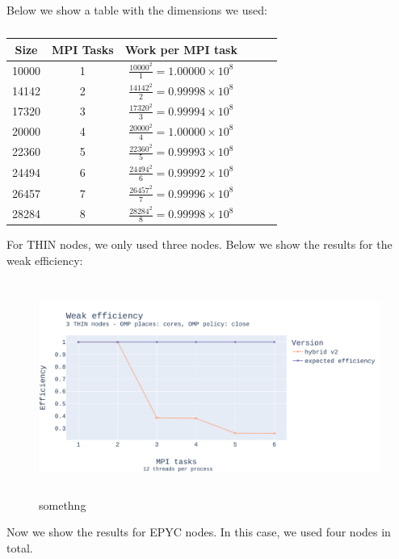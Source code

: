 \documentclass{report}
\begin{document}
Below we show a table with the dimensions we used:

\begin{table}[H]
\centering
\begin{tabular}{|c|c|c|c|c|c|}
    \hline
    Size & MPI Tasks & Work per MPI task \\\hline
    10000 &    1     & $\frac{10000^2}{1}=1.00000\times 10^8$ \\
    14142 &    2     & $\frac{14142^2}{2}=0.99998\times 10^8$\\
    17320 &    3     & $\frac{17320^2}{3}=0.99994\times 10^8$ \\
    20000 &    4     & $\frac{20000^2}{4}=1.00000\times 10^8$\\
    22360 &    5     & $\frac{22360^2}{5}=0.99993\times 10^8$\\
    24494 &    6     & $\frac{24494^2}{6}=0.99992\times 10^8$\\
    26457 &    7     & $\frac{26457^2}{7}=0.99996\times 10^8$\\
    28284 &    8     & $\frac{28284^2}{8}=0.99998\times 10^8$\\ \hline
\end{tabular}
\caption{\label{tab:weak}}
\end{table}

For THIN nodes, we only used three nodes. Below we show the results for the 
weak efficiency:

\begin{figure}[H]
\centering
\includegraphics[width=14cm, height=7cm]{./images/weak_MPI_thin_hybrid.pdf}
\caption{\label{fig:weakmpithinhybrid} somethng}
\end{figure}

Now we show the results for EPYC nodes. In this case, we used four nodes in total.
\end{document}
